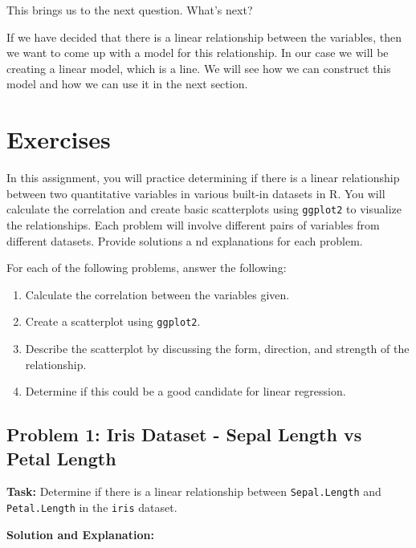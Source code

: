 \documentclass[
  letterpaper,
  DIV=11,
  numbers=noendperiod]{scrreprt}
\providecommand{\tightlist}{%
  \setlength{\itemsep}{0pt}\setlength{\parskip}{0pt}}\usepackage{longtable,booktabs,array}
\begin{document}
This brings us to the next question. What's next?

If we have decided that there is a linear relationship between the
variables, then we want to come up with a model for this relationship.
In our case we will be creating a linear model, which is a line. We will
see how we can construct this model and how we can use it in the next
section.

\section*{Exercises}\label{exercises-13}


In this assignment, you will practice determining if there is a linear
relationship between two quantitative variables in various built-in
datasets in R. You will calculate the correlation and create basic
scatterplots using \texttt{ggplot2} to visualize the relationships. Each
problem will involve different pairs of variables from different
datasets. Provide solutions a nd explanations for each problem.

For each of the following problems, answer the following:

\begin{enumerate}
\def\labelenumi{\arabic{enumi}.}
\tightlist
\item
  Calculate the correlation between the variables given.
\item
  Create a scatterplot using \texttt{ggplot2}.
\item
  Describe the scatterplot by discussing the form, direction, and
  strength of the relationship.
\item
  Determine if this could be a good candidate for linear regression.
\end{enumerate}

\subsection*{Problem 1: Iris Dataset - Sepal Length vs Petal
Length}\label{problem-1-iris-dataset---sepal-length-vs-petal-length}

\textbf{Task:} Determine if there is a linear relationship between
\texttt{Sepal.Length} and \texttt{Petal.Length} in the \texttt{iris}
dataset.

\textbf{Solution and Explanation:}
\end{document}

